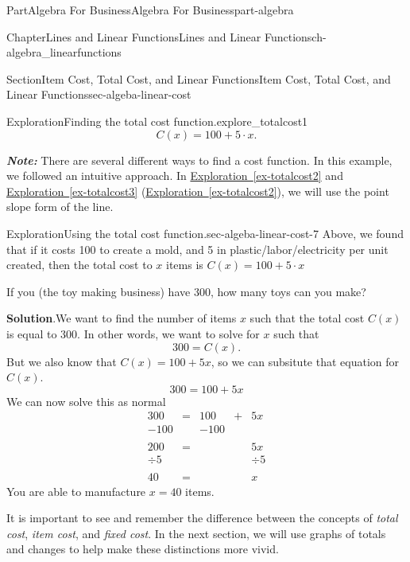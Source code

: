 \documentclass{tufte-book}
\newcommand{\blocktitlefont}{\relax}
\newcommand{\xreffont}{\relax}
\newcommand{\alert}[1]{\textbf{\textit{#1}}}
\numberwithin{equation}{chapter}
\newcommand{\amp}{&}
\begin{document}
\begin{partptx}{Part}{Algebra For Business}{}{Algebra For Business}{}{}{part-algebra}
\begin{chapterptx}{Chapter}{Lines and Linear Functions}{}{Lines and Linear Functions}{}{}{ch-algebra_linearfunctions}
\begin{sectionptx}{Section}{Item Cost, Total Cost, and Linear Functions}{}{Item Cost, Total Cost, and Linear Functions}{}{}{sec-algeba-linear-cost}
\begin{exploration}{Exploration}{Finding the total cost function.}{explore_totalcost1}
\begin{equation*}
C(x) = 100 + 5\cdot x\text{.}
\end{equation*}
%
\par
\alert{Note:} There are several different ways to find a cost function. In this example, we followed an intuitive approach. In \hyperref[ex-totalcost2]{Exploration~{\xreffont\ref{ex-totalcost2}}} and \hyperref[ex-totalcost3]{Exploration~{\xreffont\ref{ex-totalcost3}}} (\hyperref[ex-totalcost2]{Exploration~{\xreffont\ref{ex-totalcost2}}\textendash{}{\xreffont\ref{ex-totalcost3}}}), we will use the point slope form of the line.%
\end{exploration}%
\begin{exploration}{Exploration}{Using the total cost function.}{sec-algeba-linear-cost-7}%
Above, we found that if it costs \textdollar{}100 to create a mold, and \textdollar{}5 in plastic\slash{}labor\slash{}electricity per unit created, then the total cost to \(x\) items is  \(C(x) = 100 + 5\cdot x\)%
\par
If you (the toy making business) have \textdollar{}300, how many toys can you make?%
\par\smallskip%
\noindent\textbf{\blocktitlefont Solution}.\hypertarget{sec-algeba-linear-cost-7-3}{}\quad{}We want to find the number of items \(x\) such that the total cost \(C(x)\) is equal to 300.  In other words, we want to solve for \(x\) such that%
\begin{equation*}
300 = C(x)\text{.}
\end{equation*}
But we also know that \(C(x)=100+5x\), so we can subsitute that equation for \(C(x)\).%
\begin{equation*}
300 = 100 + 5x
\end{equation*}
We can now solve this as normal%
\begin{align*}
300 \amp =\amp 100 \amp + \amp 5x\\
-100\amp  \amp -100 \amp   \amp \\
\amp \\
200 \amp =\amp \amp   \amp 5x\\
\div 5 \amp\amp \amp \amp \div 5 \\
\amp \\
40 \amp =\amp \amp \amp x
\end{align*}
You are able to manufacture \(x=40\) items.%
\end{exploration}%
It is important to see and remember the difference between the concepts of \emph{total cost}, \emph{item cost}, and \emph{fixed cost}.  In the next section, we will use graphs of totals and changes to help make these distinctions more vivid.%

\end{sectionptx}
\end{chapterptx}
\end{partptx}
\end{document}

